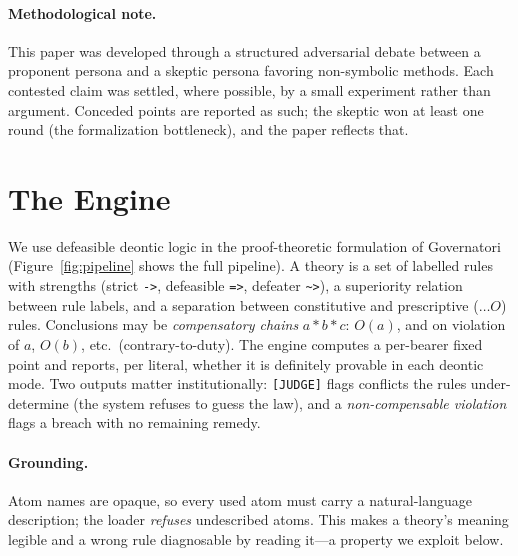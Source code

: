 \paragraph{Methodological note.}
This paper was developed through a structured adversarial debate between a
proponent persona and a skeptic persona favoring non-symbolic methods. Each
contested claim was settled, where possible, by a small experiment rather than
argument. Conceded points are reported as such; the skeptic won at least one round
(the formalization bottleneck), and the paper reflects that.

\section{The Engine}
We use defeasible deontic logic in the proof-theoretic formulation of Governatori
(Figure~\ref{fig:pipeline} shows the full pipeline).
A theory is a set of labelled rules with strengths (strict \texttt{->}, defeasible
\texttt{=>}, defeater \texttt{\textasciitilde>}), a superiority relation between
rule labels, and a separation between constitutive and prescriptive ($\dots O$)
rules. Conclusions may be \emph{compensatory chains} $a * b * c$: $O(a)$, and on
violation of $a$, $O(b)$, etc.\ (contrary-to-duty). The engine computes a per-bearer
fixed point and reports, per literal, whether it is definitely provable in each
deontic mode. Two outputs matter institutionally: \texttt{[JUDGE]} flags conflicts
the rules under-determine (the system refuses to guess the law), and a
\emph{non-compensable violation} flags a breach with no remaining remedy.

\paragraph{Grounding.} Atom names are opaque, so every used atom must carry a
natural-language description; the loader \emph{refuses} undescribed atoms. This
makes a theory's meaning legible and a wrong rule diagnosable by reading it---a
property we exploit below.

